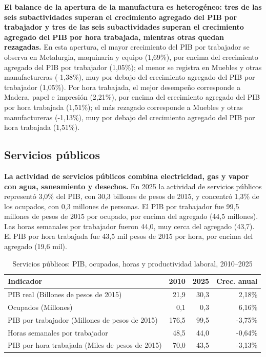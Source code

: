 \textbf{El balance de la apertura de la manufactura es heterogéneo: tres de las seis subactividades superan el crecimiento agregado del PIB por trabajador y tres de las seis subactividades superan el crecimiento agregado del PIB por hora trabajada, mientras otras quedan rezagadas.} En esta apertura, el mayor crecimiento del PIB por trabajador se observa en Metalurgia, maquinaria y equipo (1,69\%), por encima del crecimiento agregado del PIB por trabajador (1,05\%); el menor se registra en Muebles y otras manufactureras (-1,38\%), muy por debajo del crecimiento agregado del PIB por trabajador (1,05\%). Por hora trabajada, el mejor desempeño corresponde a Madera, papel e impresión (2,21\%), por encima del crecimiento agregado del PIB por hora trabajada (1,51\%); el más rezagado corresponde a Muebles y otras manufactureras (-1,13\%), muy por debajo del crecimiento agregado del PIB por hora trabajada (1,51\%).

\subsection{Servicios públicos}

\textbf{La actividad de servicios públicos combina electricidad, gas y vapor con agua, saneamiento y desechos.} En 2025 la actividad de servicios públicos representó 3,0\% del PIB, con 30,3 billones de pesos de 2015, y concentró 1,3\% de los ocupados, con 0,3 millones de personas. El PIB por trabajador fue 99,5 millones de pesos de 2015 por ocupado, por encima del agregado (44,5 millones). Las horas semanales por trabajador fueron 44,0, muy cerca del agregado (43,7). El PIB por hora trabajada fue 43,5 mil pesos de 2015 por hora, por encima del agregado (19,6 mil).

\begin{table}[H]
\centering
\caption{Servicios públicos: PIB, ocupados, horas y productividad laboral, 2010--2025}
\label{tab:sector_d_e_productividad}
\small
\begin{tabular}{lrrr}
\toprule
Indicador & 2010 & 2025 & Crec. anual \\
\midrule
PIB real  (Billones de pesos de 2015) & 21,9 & 30,3 & 2,18\% \\
Ocupados (Millones) & 0,1 & 0,3 & 6,16\% \\
PIB por trabajador (Millones de pesos de 2015) & 176,5 & 99,5 & -3,75\% \\
Horas semanales por trabajador & 48,5 & 44,0 & -0,64\% \\
PIB por hora trabajada (Miles de pesos de 2015) & 70,0 & 43,5 & -3,13\% \\
\bottomrule
\end{tabular}
\end{table}

